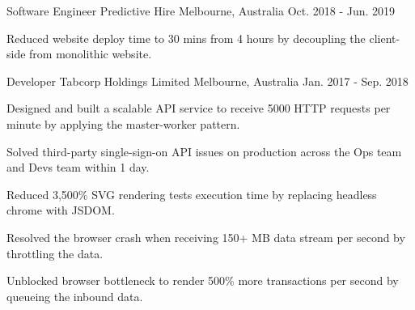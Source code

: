 \begin{cventries}
  \cventry
  {Software Engineer} %
  {Predictive Hire} %
  {Melbourne, Australia} %
  {Oct. 2018 - Jun. 2019} %
  {
    \begin{cvitems} %
      \item {Reduced website deploy time to 30 mins from 4 hours by decoupling the client-side from monolithic website.}
    \end{cvitems}
  }

  \cventry
  {Developer} %
  {Tabcorp Holdings Limited} %
  {Melbourne, Australia}
  {Jan. 2017 - Sep. 2018} %
  {
    \begin{cvitems} %
      \item {Designed and built a scalable API service to receive 5000 HTTP requests per minute by applying the master-worker pattern.}
      \item {Solved third-party single-sign-on API issues on production across the Ops team and Devs team within 1 day.}
      \item {Reduced 3,500\% SVG rendering tests execution time by replacing headless chrome with JSDOM.}
      \item {Resolved the browser crash when receiving 150+ MB data stream per second by throttling the data.}
      \item {Unblocked browser bottleneck to render 500\% more transactions per second by queueing the inbound data.}
    \end{cvitems}
  }


\end{cventries}
